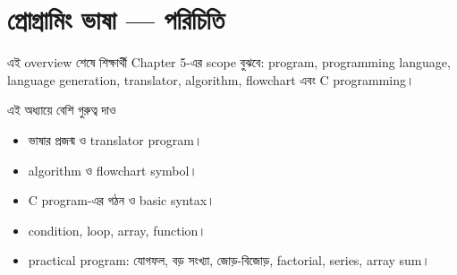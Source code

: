 \section{প্রোগ্রামিং ভাষা — পরিচিতি}

\begin{learningbox}
এই overview শেষে শিক্ষার্থী Chapter 5-এর scope বুঝবে: program, programming language, language generation, translator, algorithm, flowchart এবং C programming।
\end{learningbox}

\begin{center}
\end{center}

\begin{keypointbox}{এই অধ্যায়ে বেশি গুরুত্ব দাও}
\begin{itemize}
\item ভাষার প্রজন্ম ও translator program।
\item algorithm ও flowchart symbol।
\item C program-এর গঠন ও basic syntax।
\item condition, loop, array, function।
\item practical program: যোগফল, বড় সংখ্যা, জোড়-বিজোড়, factorial, series, array sum।
\end{itemize}
\end{keypointbox}
